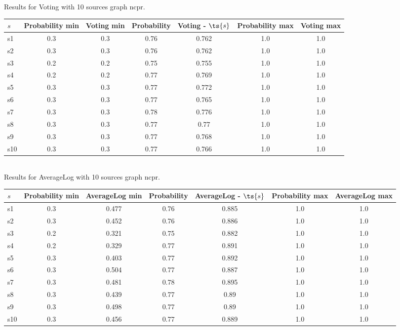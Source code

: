 \documentclass{article}
\begin{document}
\noindent Results for Voting with 10 sources graph ncpr.

\noindent\begin{tabular}{|l|c|c|c|c|c|c|}
\hline
$s$& Probability min & Voting min & Probability & Voting - $\ts{s}$ & Probability max & Voting max\\
\hline
s1 &0.3 & 0.3 & 0.76 & 0.762 & 1.0 & 1.0\\
\hline
s2 &0.3 & 0.3 & 0.76 & 0.762 & 1.0 & 1.0\\
\hline
s3 &0.2 & 0.2 & 0.75 & 0.755 & 1.0 & 1.0\\
\hline
s4 &0.2 & 0.2 & 0.77 & 0.769 & 1.0 & 1.0\\
\hline
s5 &0.3 & 0.3 & 0.77 & 0.772 & 1.0 & 1.0\\
\hline
s6 &0.3 & 0.3 & 0.77 & 0.765 & 1.0 & 1.0\\
\hline
s7 &0.3 & 0.3 & 0.78 & 0.776 & 1.0 & 1.0\\
\hline
s8 &0.3 & 0.3 & 0.77 & 0.77 & 1.0 & 1.0\\
\hline
s9 &0.3 & 0.3 & 0.77 & 0.768 & 1.0 & 1.0\\
\hline
s10 &0.3 & 0.3 & 0.77 & 0.766 & 1.0 & 1.0\\
\hline
\end{tabular}\\

\noindent Results for AverageLog with 10 sources graph ncpr.

\noindent\begin{tabular}{|l|c|c|c|c|c|c|}
\hline
$s$& Probability min & AverageLog min & Probability & AverageLog - $\ts{s}$ & Probability max & AverageLog max\\
\hline
s1 &0.3 & 0.477 & 0.76 & 0.885 & 1.0 & 1.0\\
\hline
s2 &0.3 & 0.452 & 0.76 & 0.886 & 1.0 & 1.0\\
\hline
s3 &0.2 & 0.321 & 0.75 & 0.882 & 1.0 & 1.0\\
\hline
s4 &0.2 & 0.329 & 0.77 & 0.891 & 1.0 & 1.0\\
\hline
s5 &0.3 & 0.403 & 0.77 & 0.892 & 1.0 & 1.0\\
\hline
s6 &0.3 & 0.504 & 0.77 & 0.887 & 1.0 & 1.0\\
\hline
s7 &0.3 & 0.481 & 0.78 & 0.895 & 1.0 & 1.0\\
\hline
s8 &0.3 & 0.439 & 0.77 & 0.89 & 1.0 & 1.0\\
\hline
s9 &0.3 & 0.498 & 0.77 & 0.89 & 1.0 & 1.0\\
\hline
s10 &0.3 & 0.456 & 0.77 & 0.889 & 1.0 & 1.0\\
\hline
\end{tabular}\\
\end{document}
